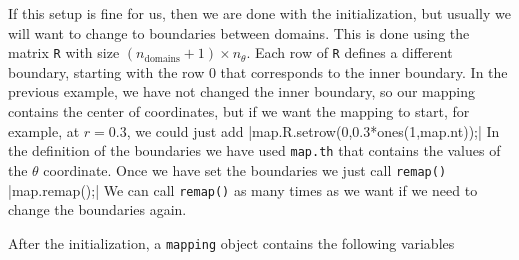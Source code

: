 If this setup is fine for us,
then we are done with the initialization, but usually we will want to change to boundaries between
domains. This is done using the matrix \verb|R| with size $(n_\mathrm{domains}+1)\times n_\theta$.
Each row of \verb|R| defines a different boundary, starting with the row 0 that corresponds to the inner boundary.
In the previous example, we have not changed the inner boundary, so our mapping contains the center of 
coordinates, but if we want the mapping to start, for example, at $r=0.3$, we could just add
|map.R.setrow(0,0.3*ones(1,map.nt));|
In the definition of the boundaries we have used \verb|map.th| that contains the values of the $\theta$ coordinate.
Once we have set the boundaries we just call \verb|remap()|
|map.remap();|
We can call \verb|remap()| as many times as we want if we need to change the boundaries again.

After the initialization, a \verb|mapping| object contains the following variables

\medskip

\renewcommand{\arraystretch}{1.3} 

